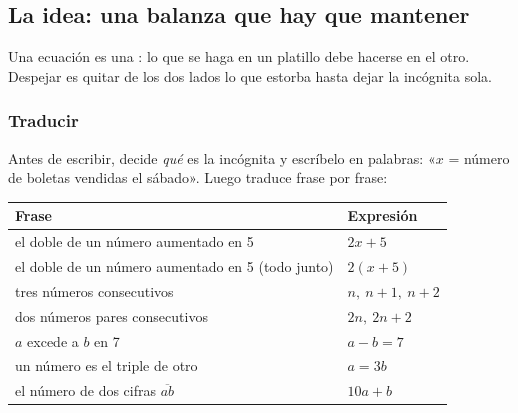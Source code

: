 

\subsection{La idea: una balanza que hay que mantener}
Una ecuación es una : lo que se haga en un platillo debe hacerse en el otro. Despejar es
quitar de los dos lados lo que estorba hasta dejar la incógnita sola.


\subsubsection{Traducir}
Antes de escribir, decide \emph{qué} es la incógnita y escríbelo en palabras: «$x$ = número de boletas vendidas el
sábado». Luego traduce frase por frase:

\begin{center}\small
\begin{tabular}{@{}ll@{}}
\toprule
\textbf{Frase} & \textbf{Expresión}\\\midrule
el doble de un número aumentado en 5 & $2x + 5$\\
el doble de un número aumentado en 5 (todo junto) & $2(x + 5)$\\
tres números consecutivos & $n,\ n + 1,\ n + 2$\\
dos números pares consecutivos & $2n,\ 2n + 2$\\
$a$ excede a $b$ en 7 & $a - b = 7$\\
un número es el triple de otro & $a = 3b$\\
el número de dos cifras $\overline{ab}$ & $10a + b$\\
\bottomrule
\end{tabular}
\end{center}


